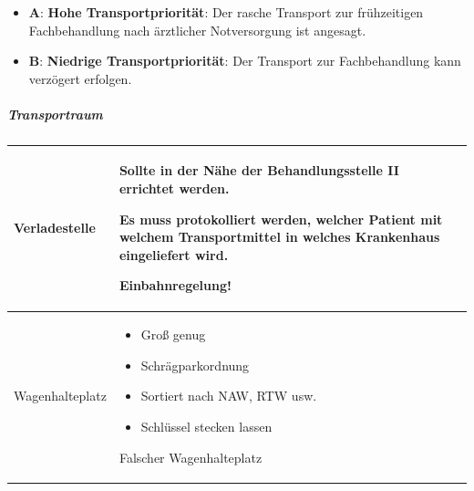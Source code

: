 \documentclass{article}
\newcommand\gEs[1]{\textbf{\textcolor[rgb]{0.0,0.0,0.5019608}{#1}}}
\newcommand\gEs[1]{\textbf{\textcolor[rgb]{0.0,0.0,0.5019608}{#1}}}
\begin{document}
\begin{itemize}
\item {\mdseries
\gEs{A}: \gEs{Hohe
Transportpriorit\"at}: Der rasche Transport zur fr\"uhzeitigen
Fachbehandlung nach \"arztlicher Notversorgung ist angesagt. }

\item {\mdseries
\gEs{B}: \gEs{Niedrige
Transportpriorit\"at}: Der Transport zur Fachbehandlung kann
verz\"ogert erfolgen. }

\end{itemize}
\subparagraph{Transportraum}
\begin{center}
\tablehead{}\begin{supertabular}{|m{2.365cm}m{5.8640003cm}m{4.8710003cm}|}
\hline
{\mdseries\color{black} Verladestelle}

 &
{\mdseries Sollte in der N\"ahe der Behandlungsstelle II errichtet
werden.}

{\mdseries Es muss protokolliert werden, welcher Patient mit welchem
Transportmittel in welches Krankenhaus eingeliefert wird.}

{\mdseries Einbahnregelung!}

 &
{%
 \par}

\\\hline
{\mdseries\color{black} Wagenhalte\-platz}

 &
\begin{itemize}
\item {\mdseries Gro{\ss} genug}

\item {\mdseries Schr\"agparkordnung }

\item {\mdseries Sortiert nach NAW, RTW usw.}

\item {\mdseries Schl\"ussel stecken lassen}

\end{itemize}
{%
 \par}

\centering Falscher Wagenhalteplatz\par

 &
{%
 \par}


\end{supertabular}
\end{center}
\end{document}

